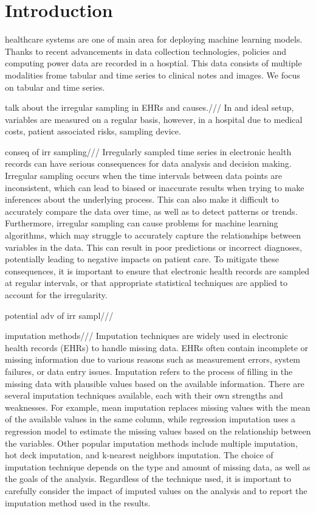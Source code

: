 \documentclass[journal,twoside,web]{ieeecolor}
\begin{document}
\section{Introduction}
\label{sec:intro}



healthcare systems are one of main area for deploying machine learning models. Thanks to recent advancements in data collection technologies, policies and computing power data are recorded in a hosptial. This data consists of multiple modalities frome tabular and time series to clinical notes and images. We focus on tabular and time series. \cite{zuoTransformerHawkesProcess2020a}


talk about the irregular sampling in EHRs and causes.///
In and ideal setup, variables are measured on a regular basis, however, in a hospital due to medical costs, patient associated risks, sampling device.

conseq of irr sampling/// Irregularly sampled time series in electronic health records can have serious consequences for data analysis and decision making. Irregular sampling occurs when the time intervals between data points are inconsistent, which can lead to biased or inaccurate results when trying to make inferences about the underlying process. This can also make it difficult to accurately compare the data over time, as well as to detect patterns or trends. Furthermore, irregular sampling can cause problems for machine learning algorithms, which may struggle to accurately capture the relationships between variables in the data. This can result in poor predictions or incorrect diagnoses, potentially leading to negative impacts on patient care. To mitigate these consequences, it is important to ensure that electronic health records are sampled at regular intervals, or that appropriate statistical techniques are applied to account for the irregularity.

potential adv of irr sampl/// 

imputation methods/// Imputation techniques are widely used in electronic health records (EHRs) to handle missing data. EHRs often contain incomplete or missing information due to various reasons such as measurement errors, system failures, or data entry issues. Imputation refers to the process of filling in the missing data with plausible values based on the available information. There are several imputation techniques available, each with their own strengths and weaknesses. For example, mean imputation replaces missing values with the mean of the available values in the same column, while regression imputation uses a regression model to estimate the missing values based on the relationship between the variables. Other popular imputation methods include multiple imputation, hot deck imputation, and k-nearest neighbors imputation. The choice of imputation technique depends on the type and amount of missing data, as well as the goals of the analysis. Regardless of the technique used, it is important to carefully consider the impact of imputed values on the analysis and to report the imputation method used in the results.
\end{document}
